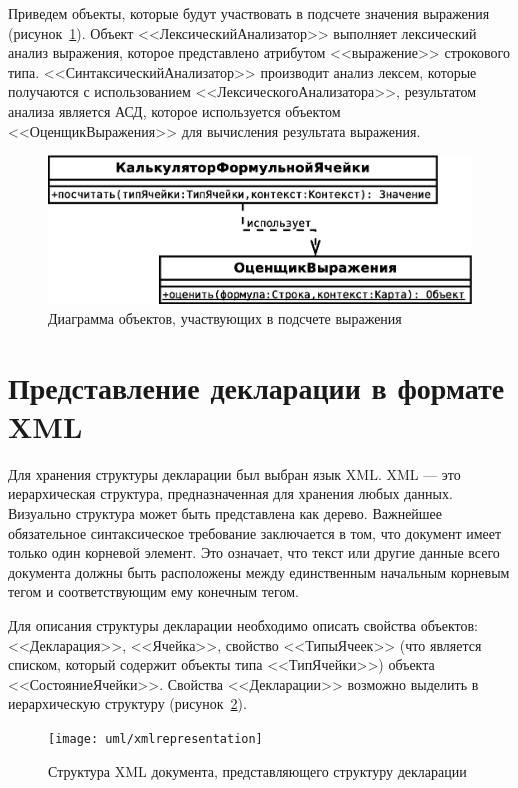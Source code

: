 \documentclass[14pt,a4paper]{reportmod}
\begin{document}
Приведем объекты, которые будут участвовать в подсчете значения выражения (рисунок~\ref{pic:classes_4}).
Объект <<ЛексическийАнализатор>> выполняет лексический анализ выражения, которое представлено атрибутом <<выражение>> строкового типа. <<СинтаксическийАнализатор>> производит анализ лексем, которые получаются с использованием <<ЛексическогоАнализатора>>, результатом анализа является АСД, которое используется объектом <<ОценщикВыражения>> для вычисления результата выражения.

\begin{figure}
  \centering
  \includegraphics[scale=0.5]{uml/_classes_4}
  \caption{Диаграмма объектов, участвующих в подсчете выражения}
  \label{pic:classes_4}
\end{figure}

\section{Представление декларации в формате XML}
Для хранения структуры декларации был выбран язык XML\cite{xmlbas}. XML — это иерархическая структура, предназначенная для хранения любых данных. Визуально структура может быть представлена как дерево. Важнейшее обязательное синтаксическое требование заключается в том, что документ имеет только один корневой элемент. Это означает, что текст или другие данные всего документа должны быть расположены между единственным начальным корневым тегом и соответствующим ему конечным тегом.

Для описания структуры декларации необходимо описать свойства объектов: <<Декларация>>, <<Ячейка>>, свойство <<ТипыЯчеек>> (что является списком, который содержит объекты типа <<ТипЯчейки>>) объекта <<СостояниеЯчейки>>. Свойства <<Декларации>> возможно выделить в иерархическую структуру (рисунок~\ref{pic:xmlrepresentation}).

\begin{figure}[ht]
  \centering
  \texttt{[image: uml/xmlrepresentation]}
  \caption{Структура XML документа, представляющего структуру декларации}
  \label{pic:xmlrepresentation}
\end{figure}
\end{document}
